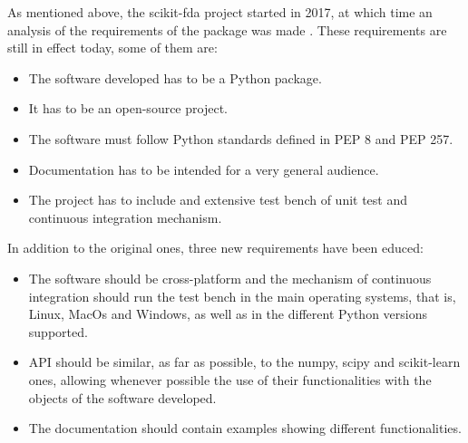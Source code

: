 
As mentioned above, the scikit-fda project started in 2017, at which time an
analysis of the requirements of the package was made \cite{FDA2018}. These
requirements are still in effect today, some of them are:

\begin{itemize}
\item The software developed has to be a Python package.
\item It has to be an open-source project.
\item The software must follow Python standards defined in PEP 8 and PEP 257.
\item Documentation has to be intended for a very general audience.
\item The project has to include and extensive test bench of unit test and continuous integration mechanism.
\end{itemize}
In addition to the original ones, three new requirements have been educed:

\begin{itemize}
\item The software should be cross-platform and the mechanism of
 continuous integration should run the test bench in the main operating systems, that is, 
 Linux, MacOs and Windows, as well as in the different Python versions supported.
 
\item  API should be similar, as far as possible, to the numpy\cite{numpy}, scipy\cite{scipy} and
 scikit-learn\cite{sklearn} ones, allowing whenever possible the use of their functionalities with the
  objects of the software developed.
\item The documentation should contain examples showing different functionalities.
\end{itemize}
